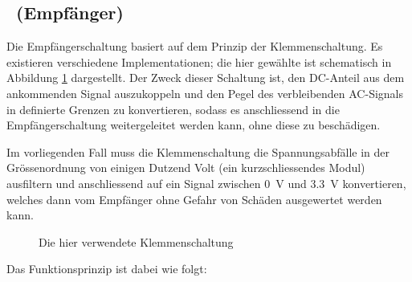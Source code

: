 \clearpage
\subsection{\Master~(Empf\"anger)}
\label{subsec:simu:ask:recv}

Die  Empf\"angerschaltung basiert  auf  dem  Prinzip der  Klemmenschaltung. Es
existieren verschiedene Implementationen; die  hier gew\"ahlte ist schematisch
in Abbildung \ref{fig:circuit:clamper} dargestellt. Der Zweck dieser Schaltung
ist, den DC-Anteil  aus dem ankommenden Signal auszukoppeln und  den Pegel des
verbleibenden  AC-Signals in  definierte  Grenzen zu  konvertieren, sodass  es
anschliessend  in die  Empf\"angerschaltung weitergeleitet  werden kann,  ohne
diese zu besch\"adigen.

Im vorliegenden Fall  muss die Klemmenschaltung die  Spannungsabf\"alle in der
Gr\"ossenordnung  von  einigen  Dutzend  Volt  (ein  kurzschliessendes  Modul)
ausfiltern  und  anschliessend  auf  ein  Signal  zwischen  \SI{0}{\volt}  und
\SI{3.3}{\volt}  konvertieren, welches  dann vom  Empf\"anger ohne  Gefahr von
Sch\"aden ausgewertet werden kann.

\begin{figure}[h!tb]
    \centering
    
    \caption[Klemmenschaltung]{Die hier verwendete Klemmenschaltung}
    \label{fig:circuit:clamper}
\end{figure}

Das Funktionsprinzip ist dabei wie folgt:

